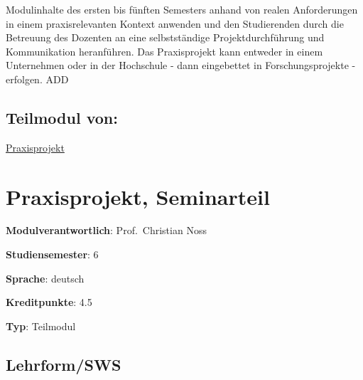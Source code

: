 Modulinhalte des ersten bis fünften Semesters anhand von realen
Anforderungen in einem praxisrelevanten Kontext anwenden und den
Studierenden durch die Betreuung des Dozenten an eine selbstständige
Projektdurchführung und Kommunikation heranführen. Das Praxisprojekt
kann entweder in einem Unternehmen oder in der Hochschule - dann
eingebettet in Forschungsprojekte - erfolgen. ADD

\hypertarget{teilmodul-vonpathlabelmi-2017modulbeschreibungen-bachelorba_praxisprojektarbeit}{%
\section*{Teilmodul
von:\label{/mi-2017/modulbeschreibungen-bachelor/BA_Praxisprojektarbeit}}\label{teilmodul-vonpathlabelmi-2017modulbeschreibungen-bachelorba_praxisprojektarbeit}}

\hyperref[/mi-2017/modulbeschreibungen-bachelor/BA_Praxisprojekt]{Praxisprojekt}

\hypertarget{praxisprojekt-seminarteilpathlabelmi-2017modulbeschreibungen-bachelorba_praxisprojektseminar}{%
\chapter{Praxisprojekt,
Seminarteil\label{/mi-2017/modulbeschreibungen-bachelor/BA_Praxisprojektseminar}}\label{praxisprojekt-seminarteilpathlabelmi-2017modulbeschreibungen-bachelorba_praxisprojektseminar}}

\begin{modulHead}
\textbf{Modulverantwortlich}: Prof.~Christian
Noss
\end{modulHead}
\begin{modulHead}
\textbf{Studiensemester}:
6
\end{modulHead}
\begin{modulHead}
\textbf{Sprache}:
deutsch
\end{modulHead}
\begin{modulHead}
\textbf{Kreditpunkte}:
4.5
\end{modulHead}
\begin{modulHead}
\textbf{Typ}:
Teilmodul
\end{modulHead}


\hypertarget{lehrformswspathlabelmi-2017modulbeschreibungen-bachelorba_praxisprojektseminar}{%
\section*{Lehrform/SWS\label{/mi-2017/modulbeschreibungen-bachelor/BA_Praxisprojektseminar}}\label{lehrformswspathlabelmi-2017modulbeschreibungen-bachelorba_praxisprojektseminar}}

